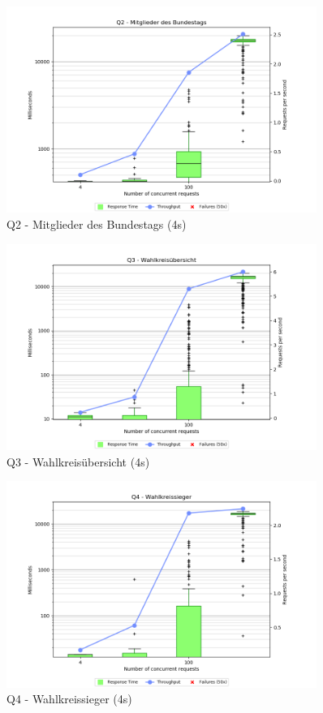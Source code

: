 \documentclass[a4paper]{scrreprt}
\begin{document}
\begin{figure}[h]
\centering
\includegraphics[width=0.9\textwidth]{images/plots_4s/Q2}
\caption {Q2 - Mitglieder des Bundestags (4s)}
\end{figure}

\begin{figure}[h]
\centering
\includegraphics[width=0.9\textwidth]{images/plots_4s/Q3}
\caption {Q3 - Wahlkreisübersicht (4s)}
\end{figure}

\begin{figure}[h]
\centering
\includegraphics[width=0.9\textwidth]{images/plots_4s/Q4}
\caption {Q4 - Wahlkreissieger (4s)}
\end{figure}
\end{document}
